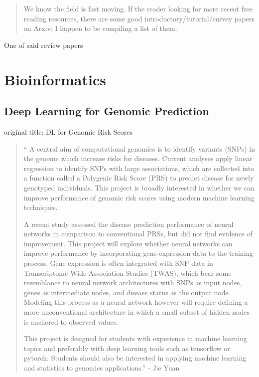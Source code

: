 \begin{quote}
We know the field is fast moving. If the reader looking for more recent free reading resources, there are some good introductory/tutorial/survey papers on Arxiv; I happen to be compiling a list of them.
\end{quote}

 One of said review papers \cite{raghu2020survey}

\cite[hello]{raghu2020survey}


\chapter{Bioinformatics}

\section{Deep Learning for Genomic Prediction}

original title: DL for Genomic Risk Scores
\begin{quotation}
``
A central aim of computational genomics is to identify variants (SNPs) in the genome which increase risks for diseases. Current analyses apply linear regression to identify SNPs with large associations, which are collected into a function called a Polygenic Risk Score (PRS) to predict disease for newly genotyped individuals. This project is broadly interested in whether we can improve performance of genomic risk scores using modern machine learning techniques.

A recent study assessed the disease prediction performance of neural networks in comparison to conventional PRSs, but did not find evidence of improvement. This project will explore whether neural networks can improve performance by incorporating gene expression data to the training process. Gene expression is often integrated with SNP data in Transcriptome-Wide Association Studies (TWAS), which bear some resemblance to neural network architectures with SNPs as input nodes, genes as intermediate nodes, and disease status as the output node. Modeling this process as a neural network however will require defining a more unconventional architecture in which a small subset of hidden nodes is anchored to observed values.

This project is designed for students with experience in machine learning topics and preferably with deep learning tools such as tensorflow or pytorch. Students should also be interested in applying machine learning and statistics to genomics applications.'' - Jie Yuan
\end{quotation}

